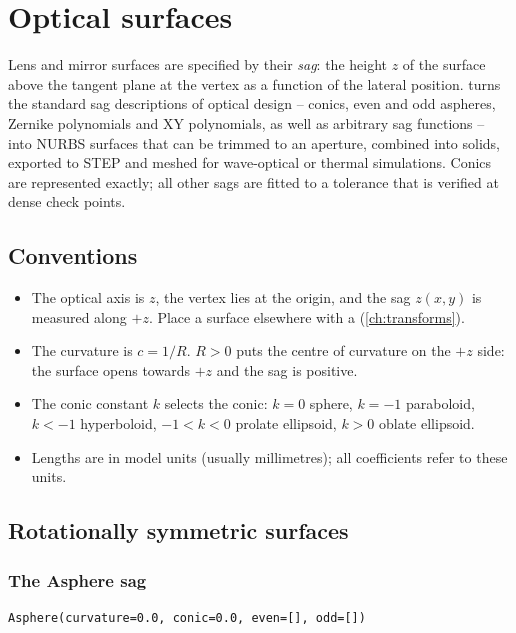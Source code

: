 \chapter{Optical surfaces}\label{ch:optics}

Lens and mirror surfaces are specified by their \emph{sag}: the height $z$ of the surface above
the tangent plane at the vertex as a function of the lateral position. \NF{} turns the standard
sag descriptions of optical design -- conics, even and odd aspheres, Zernike polynomials and XY
polynomials, as well as arbitrary sag functions -- into NURBS surfaces that can be trimmed to an
aperture, combined into solids, exported to STEP and meshed for wave-optical or thermal
simulations. Conics are represented exactly; all other sags are fitted to a tolerance that is
verified at dense check points.

\section{Conventions}\label{sec:optics-conventions}

\begin{itemize}
\item The optical axis is $z$, the vertex lies at the origin, and the sag $z(x,y)$ is measured
  along $+z$. Place a surface elsewhere with a  (\cref{ch:transforms}).
\item The curvature is $c = 1/R$. $R > 0$ puts the centre of curvature on the $+z$ side: the
  surface opens towards $+z$ and the sag is positive.
\item The conic constant $k$ selects the conic: $k = 0$ sphere, $k = -1$ paraboloid, $k < -1$
  hyperboloid, $-1 < k < 0$ prolate ellipsoid, $k > 0$ oblate ellipsoid.
\item Lengths are in model units (usually millimetres); all coefficients refer to these units.
\end{itemize}

\section{Rotationally symmetric surfaces}\label{sec:aspheres}

\subsection{The Asphere sag}

\begin{lstlisting}[style=text]
Asphere(curvature=0.0, conic=0.0, even=[], odd=[])
\end{lstlisting}


